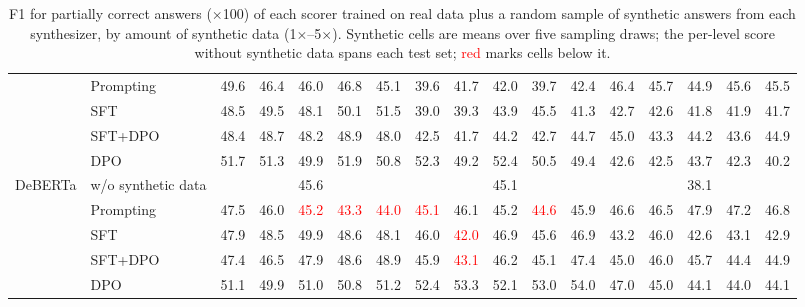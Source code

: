 \begin{table}[t]
\begin{tabular}{llccccccccccccccc}
 & Prompting & 49.6 & 46.4 & 46.0 & 46.8 & 45.1 & 39.6 & 41.7 & 42.0 & 39.7 & 42.4 & 46.4 & 45.7 & 44.9 & 45.6 & 45.5 \\
 & SFT & 48.5 & 49.5 & 48.1 & 50.1 & 51.5 & 39.0 & 39.3 & 43.9 & 45.5 & 41.3 & 42.7 & 42.6 & 41.8 & 41.9 & 41.7 \\
 & SFT+DPO & 48.4 & 48.7 & 48.2 & 48.9 & 48.0 & 42.5 & 41.7 & 44.2 & 42.7 & 44.7 & 45.0 & 43.3 & 44.2 & 43.6 & 44.9 \\
 & DPO & 51.7 & 51.3 & 49.9 & 51.9 & 50.8 & 52.3 & 49.2 & 52.4 & 50.5 & 49.4 & 42.6 & 42.5 & 43.7 & 42.3 & 40.2 \\
\midrule
\multirow{5}{*}{DeBERTa} & w/o synthetic data & \multicolumn{5}{c}{45.6} & \multicolumn{5}{c}{45.1} & \multicolumn{5}{c}{38.1} \\
 & Prompting & 47.5 & 46.0 & \textcolor{red}{45.2} & \textcolor{red}{43.3} & \textcolor{red}{44.0} & \textcolor{red}{45.1} & 46.1 & 45.2 & \textcolor{red}{44.6} & 45.9 & 46.6 & 46.5 & 47.9 & 47.2 & 46.8 \\
 & SFT & 47.9 & 48.5 & 49.9 & 48.6 & 48.1 & 46.0 & \textcolor{red}{42.0} & 46.9 & 45.6 & 46.9 & 43.2 & 46.0 & 42.6 & 43.1 & 42.9 \\
 & SFT+DPO & 47.4 & 46.5 & 47.9 & 48.6 & 48.9 & 45.9 & \textcolor{red}{43.1} & 46.2 & 45.1 & 47.4 & 45.0 & 46.0 & 45.7 & 44.4 & 44.9 \\
 & DPO & 51.1 & 49.9 & 51.0 & 50.8 & 51.2 & 52.4 & 53.3 & 52.1 & 53.0 & 54.0 & 47.0 & 45.0 & 44.1 & 44.0 & 44.1 \\
\bottomrule
\end{tabular}
\caption{F1 for partially correct answers ($\times$100) of each scorer trained on real data plus a random sample of synthetic answers from each synthesizer, by amount of synthetic data (1$\times$--5$\times$). Synthetic cells are means over five sampling draws; the per-level score without synthetic data spans each test set; \textcolor{red}{red} marks cells below it.}
\label{tab:appendix-random-amount-level-1}
\end{table}

